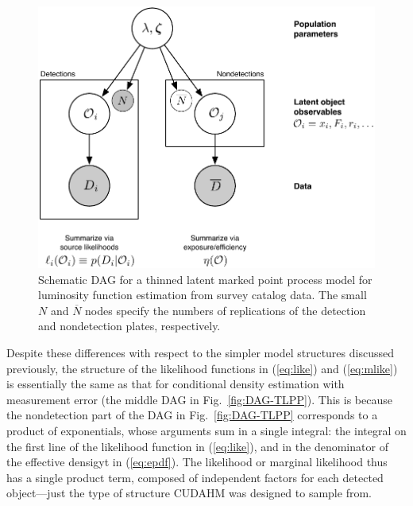 \begin{figure}
\begin{center}
\includegraphics[width=.8\textwidth]{fig/DAG-TLPP}
\end{center}
\caption{Schematic DAG for a thinned latent marked point process model for luminosity function estimation from survey catalog data.
The small $N$ and $\overline{N}$ nodes specify the numbers of replications of the detection and nondetection plates, respectively.}
\label{fig:TLPP}
\end{figure}

Despite these differences with respect to the simpler model structures discussed previously, the structure of the likelihood functions in (\ref{eq:like}) and (\ref{eq:mlike}) is essentially the same as that for conditional density estimation with measurement error (the middle DAG in Fig.~\ref{fig:DAG-TLPP}).
This is because the nondetection part of the DAG in Fig.~\ref{fig:DAG-TLPP} corresponds to a product of exponentials, whose arguments sum in a single integral: the integral on the first line of the likelihood function in (\ref{eq:like}), and in the denominator of the effective densigyt in (\ref{eq:epdf}).
The likelihood or marginal likelihood thus has a single product term, composed of independent factors for each detected object---just the type of structure CUDAHM was designed to sample from.
